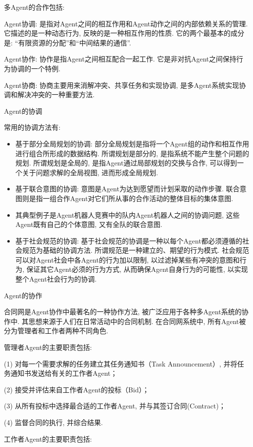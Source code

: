     多Agent的合作包括:

    Agent协调: 是指对Agent之间的相互作用和Agent动作之间的内部依赖关系的管理. 它描述的是一种动态行为, 反映的是一种相互作用的性质. 它的两个最基本的成分是: “有限资源的分配”和“中间结果的通信”.

    Agent协作: 协作是指Agent之间相互配合一起工作. 它是非对抗Agent之间保持行为协调的一个特例.

    Agent协商: 协商主要用来消解冲突、共享任务和实现协调, 是多Agent系统实现协调和解决冲突的一种重要方法.


Agent的协调

常用的协调方法有:
\begin{itemize}
\item 基于部分全局规划的协调: 部分全局规划是指将一个Agent组的动作和相互作用进行组合所形成的数据结构.
    所谓规划是部分的, 是指系统不能产生整个问题的规划.
    所谓规划是全局的, 是指Agent通过局部规划的交换与合作, 可以得到一个关于问题求解的全局视图, 进而形成全局规划.
\item 基于联合意图的协调: 意图是Agent为达到愿望而计划采取的动作步骤. 联合意图则是指一组合作Agent对它们所从事的合作活动的整体目标的集体意图.
\item 其典型例子是Agent机器人竞赛中的队内Agent机器人之间的协调问题, 这些Agent既有自己的个体意图, 又有全队的联合意图.
\item 基于社会规范的协调: 基于社会规范的协调是一种以每个Agent都必须遵循的社会规范为基础的协调方法. 所谓规范是一种建立的、期望的行为模式. 社会规范可以对Agent社会中各Agent的行为加以限制, 以过滤掉某些有冲突的意图和行为, 保证其它Agent必须的行为方式, 从而确保Agent自身行为的可能性, 以实现整个Agent社会行为的协调.
\end{itemize}


Agent的协作

    合同网是Agent协作中最著名的一种协作方法, 被广泛应用于各种多Agent系统的协作中. 其思想来源于人们在日常活动中的合同机制. 在合同网系统中, 所有Agent被分为管理者和工作者两种不同角色.

    管理者Agent的主要职责包括:

    (1) 对每一个需要求解的任务建立其任务通知书（Task Announcement）, 并将任务通知书发送给有关的工作者Agent；

    (2) 接受并评估来自工作者Agent的投标（Bid）；

    (3) 从所有投标中选择最合适的工作者Agent, 并与其签订合同(Contract)；

    (4) 监督合同的执行, 并综合结果.

    工作者Agent的主要职责包括:


